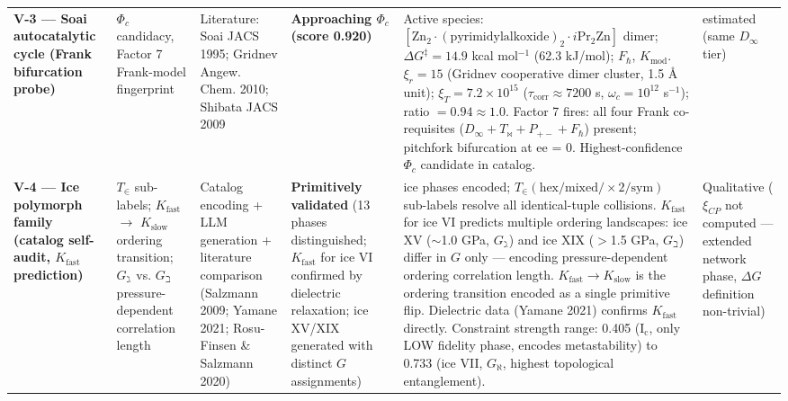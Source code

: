 \documentclass[12pt,a4paper]{article}
\begin{document}
\begin{table}[htbp]
\begin{tabularx}{\textwidth}{>{\centering\arraybackslash}X >{\centering\arraybackslash}X >{\centering\arraybackslash}X >{\centering\arraybackslash}X >{\centering\arraybackslash}X >{\centering\arraybackslash}X}
\textbf{V-3 --- Soai autocatalytic cycle (Frank bifurcation probe)} & $\Phi_c$ candidacy, Factor 7 Frank-model fingerprint & Literature: Soai JACS 1995; Gridnev Angew. Chem. 2010; Shibata JACS 2009 & \textbf{Approaching $\Phi_c$ (score 0.920)} & Active species: $[\text{Zn}_2 \cdot (\text{pyrimidylalkoxide})_2 \cdot i\text{Pr}_2\text{Zn}]$ dimer; $\Delta G^\ddagger = 14.9$ kcal mol$^{-1}$ (62.3 kJ/mol); $F_{\hbar}$, $K_{\text{mod}}$. $\xi_r = 15$ (Gridnev cooperative dimer cluster, 1.5 Å unit); $\xi_T = 7.2 \times 10^{15}$ ($\tau_{\text{corr}} \approx 7200$ s, $\omega_c = 10^{12}$ s$^{-1}$); ratio $= 0.94 \approx 1.0$. Factor 7 fires: all four Frank co-requisites ($D_{\infty} + T_{\bowtie} + P_{+-} + F_{\hbar}$) present; pitchfork bifurcation at ee = 0. Highest-confidence $\Phi_c$ candidate in catalog. & 9.21 estimated (same $D_{\infty}$ tier) \\
\textbf{V-4 --- Ice polymorph family (catalog self-audit, $K_{\text{fast}}$ prediction)} & $T_{\in}$ sub-labels; $K_{\text{fast}}$ $\to$ $K_{\text{slow}}$ ordering transition; $G_{\gimel}$ vs. $G_{\beth}$ pressure-dependent correlation length & Catalog encoding + LLM generation + literature comparison (Salzmann 2009; Yamane 2021; Rosu-Finsen \& Salzmann 2020) & \textbf{Primitively validated} (13 phases distinguished; $K_{\text{fast}}$ for ice VI confirmed by dielectric relaxation; ice XV/XIX generated with distinct $G$ assignments) & 13 ice phases encoded; $T_{\in}(\text{hex}/\text{mixed}/\times 2/\text{sym})$ sub-labels resolve all identical-tuple collisions. $K_{\text{fast}}$ for ice VI predicts multiple ordering landscapes: ice XV ($\sim$1.0 GPa, $G_{\gimel}$) and ice XIX ($>$1.5 GPa, $G_{\beth}$) differ in $G$ only --- encoding pressure-dependent ordering correlation length. $K_{\text{fast}} \to K_{\text{slow}}$ is the ordering transition encoded as a single primitive flip. Dielectric data (Yamane 2021) confirms $K_{\text{fast}}$ directly. Constraint strength range: 0.405 (I$_\text{c}$, only LOW fidelity phase, encodes metastability) to 0.733 (ice VII, $G_{\aleph}$, highest topological entanglement). & Qualitative ($\xi_{CP}$ not computed --- extended network phase, $\Delta G$ definition non-trivial) \\

\end{tabularx}
\end{table}
\end{document}
